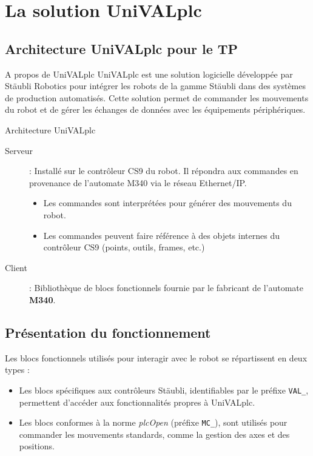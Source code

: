 
\section{La solution UniVALplc}
\subsection{Architecture UniVALplc pour le TP}
\begin{UPSTIinfor}{A propos de UniVALplc}
    UniVALplc est une solution logicielle développée par Stäubli Robotics pour intégrer les robots de la gamme Stäubli dans des systèmes de production automatisés. Cette solution permet de commander les mouvements du robot et de gérer les échanges de données avec les équipements périphériques.
\end{UPSTIinfor}
\begin{UPSTIinfor}{Architecture UniVALplc}
\begin{description}
    \item[Serveur] : Installé sur le contrôleur CS9 du robot. Il répondra aux commandes en provenance de l'automate M340 via le réseau Ethernet/IP.
    \begin{itemize}
        \item Les commandes sont interprétées pour générer des mouvements du robot.
        \item Les commandes peuvent faire référence à des objets internes du contrôleur CS9 (points, outils, frames, etc.)
    \end{itemize}
    \item[Client] : Bibliothèque de blocs fonctionnels fournie par le fabricant de l'automate \textbf{M340}. 
\end{description}
\end{UPSTIinfor}

\subsection{Présentation du fonctionnement}
Les blocs fonctionnels utilisés pour interagir avec le robot se répartissent en deux types :
\begin{itemize}
    \item Les blocs spécifiques aux contrôleurs Stäubli, identifiables par le préfixe \texttt{VAL\_}, permettent d'accéder aux fonctionnalités propres à UniVALplc.
    \item Les blocs conformes à la norme \textit{plcOpen} (préfixe \texttt{MC\_}), sont utilisés pour commander les mouvements standards, comme la gestion des axes et des positions.
\end{itemize}

